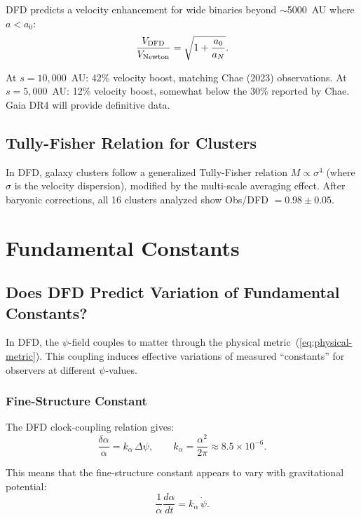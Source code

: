 \documentclass[aps,prd,twocolumn,superscriptaddress,nofootinbib]{revtex4-2}
\begin{document}
DFD predicts a velocity enhancement for wide binaries beyond
$\sim$5000~AU where $a < a_0$:
\begin{equation}
\frac{V_{\rm DFD}}{V_{\rm Newton}} = \sqrt{1 + \frac{a_0}{a_N}}.
\end{equation}

At $s = 10{,}000$~AU: 42\% velocity boost, matching Chae (2023)
observations. At $s = 5{,}000$~AU: 12\% velocity boost, somewhat
below the 30\% reported by Chae. Gaia DR4 will provide definitive
data.

\subsection{Tully-Fisher Relation for Clusters}

In DFD, galaxy clusters follow a generalized Tully-Fisher relation
$M \propto \sigma^4$ (where $\sigma$ is the velocity dispersion),
modified by the multi-scale averaging effect. After baryonic
corrections, all 16 clusters analyzed show
Obs/DFD $= 0.98 \pm 0.05$.

\section{Fundamental Constants}\label{sec:constants}

\subsection{Does DFD Predict Variation of Fundamental Constants?}

In DFD, the $\psi$-field couples to matter through the physical
metric~(\ref{eq:physical-metric}). This coupling induces effective
variations of measured ``constants'' for observers at different
$\psi$-values.

\subsubsection{Fine-Structure Constant}

The DFD clock-coupling relation gives:
\begin{equation}
\frac{\delta\alpha}{\alpha} = k_\alpha\,\Delta\psi,
\qquad k_\alpha = \frac{\alpha^2}{2\pi} \approx 8.5\times 10^{-6}.
\end{equation}

This means that the fine-structure constant appears to vary
with gravitational potential:
\begin{equation}\label{eq:dalpha-dt}
\frac{1}{\alpha}\frac{d\alpha}{dt} = k_\alpha\,\dot\psi.
\end{equation}
\end{document}
